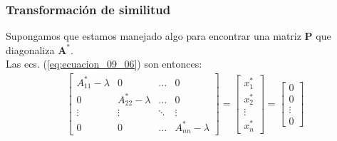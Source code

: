 \documentclass[12pt]{beamer}
\begin{document}
\begin{frame}
\frametitle{Transformación de similitud}
Supongamos que estamos manejado algo para encontrar una matriz $\mathbf{P}$ que diagonaliza $\mathbf{A}^{*}$.
\\
\bigskip
\pause
Las ecs. (\ref{eq:ecuacion_09_06}) son entonces:
\pause
\renewcommand{\arraystretch}{1}
\begin{align*}
\begin{bmatrix}
A_{11}^{*} - \lambda & 0 & \ldots & 0 \\
0  & A_{22}^{*} - \lambda & \ldots & 0 \\
\vdots  & \vdots & \ddots & \vdots \\
0 & 0 & \ldots & A_{nn}^{*} - \lambda
\end{bmatrix} = 
\begin{bmatrix}
x_{1}^{*} \\
x_{2}^{*} \\
\vdots \\
x_{n}^{*} 
\end{bmatrix} = 
\begin{bmatrix}
0 \\
0 \\
\vdots \\
0
\end{bmatrix}
\end{align*}
\end{frame}
\end{document}
